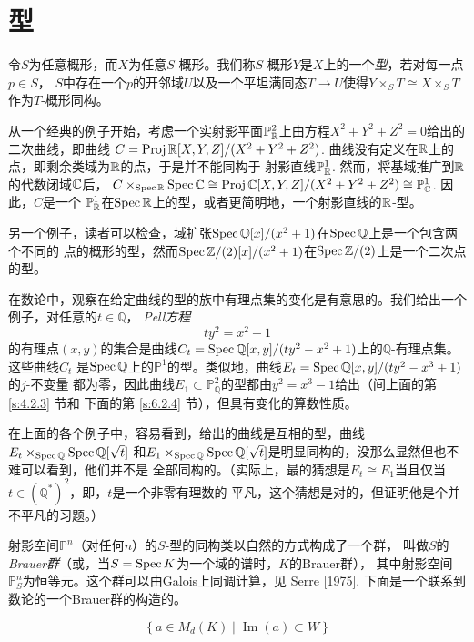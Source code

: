 \section{型}\label{s:4.4}


令$S$为任意概形，而$X$为任意$S$-概形。我们称$S$-概形$Y$是$X$上的一个\textit{型}，若对每一点$p\in S$，
$S$中存在一个$p$的开邻域$U$以及一个平坦满同态$T\to U$使得$Y\times_S T\cong X\times_S T$作为$T$-概形同构。

从一个经典的例子开始，考虑一个实射影平面$\mathbb{P}_{\mathbb{R}}^2$上由方程$X^2+Y^2+Z^2=0$给出的二次曲线，即曲线
$C=\operatorname{Proj} \mathbb{R}[X,Y,Z]/(X^2+Y^2+Z^2)$. 曲线没有定义在$\mathbb{R}$上的点，即剩余类域为$\mathbb{R}$的点，于是并不能同构于
射影直线$\mathbb{P}_{\mathbb{R}}^1$. 然而，将基域推广到$\mathbb{R}$的代数闭域$\mathbb{C}$后，
$C\times_{\operatorname{Spec} \mathbb{R}}\operatorname{Spec} \mathbb{C}\cong \operatorname{Proj} \mathbb{C}[X,Y,Z]/(X^2+Y^2+Z^2)\cong \mathbb{P}_{\mathbb{C}}^1$. 因此，$C$是一个
$\mathbb{P}_{\mathbb{R}}^1$在$\operatorname{Spec} \mathbb{R}$上的型，或者更简明地，一个射影直线的$\mathbb{R}$-型。

另一个例子，读者可以检查，域扩张$\operatorname{Spec} \mathbb Q[x]/(x^2+1)$在$\operatorname{Spec} \mathbb Q$上是一个包含两个不同的
点的概形的型，然而$\operatorname{Spec} \mathbb{Z}/(2)[x]/(x^2+1)$在$\operatorname{Spec} \mathbb{Z}/(2)$上是一个二次点的型。

在数论中，观察在给定曲线的型的族中有理点集的变化是有意思的。我们给出一个例子，对任意的$t\in \mathbb Q$，
\textit{Pell方程}
\[
    ty^2=x^2-1
\]
的有理点$(x,y)$的集合是曲线$C_t=\operatorname{Spec} \mathbb Q[x,y]/(ty^2-x^2+1)$上的$\mathbb Q$-有理点集。这些曲线$C_t$
是$\operatorname{Spec} \mathbb Q$上的$\mathbb P^1$的型。类似地，曲线$E_t=\operatorname{Spec} \mathbb Q[x,y]/(ty^2-x^3+1)$的$j$-不变量
都为零，因此曲线$E_1\subset \mathbb P_{\mathbb Q}^2$的型都由$y^2=x^3-1$给出（间上面的第 \ref{s:4.2.3} 节和
下面的第 \ref{s:6.2.4} 节），但具有变化的算数性质。

在上面的各个例子中，容易看到，给出的曲线是互相的型，曲线$E_t\times_{\operatorname{Spec} \mathbb Q}\operatorname{Spec} \mathbb Q[\sqrt{t}]$
和$E_1\times_{\operatorname{Spec} \mathbb Q}\operatorname{Spec} \mathbb Q[\sqrt{t}]$是明显同构的，没那么显然但也不难可以看到，他们并不是
全部同构的。（实际上，最\naive 的猜想是$E_t\cong E_1$当且仅当$t\in (\mathbb Q^*)^2$，即，$t$是一个非零有理数的
平凡，这个猜想是对的，但证明他是个并不平凡的习题。）


射影空间$\mathbb P^n$（对任何$n$）的$S$-型的同构类以自然的方式构成了一个群，
叫做$S$的\textit{Brauer群}（或，当$S=\operatorname{Spec} K$为一个域的谱时，$K$的Brauer群），
其中射影空间$\mathbb P_S^n$为恒等元。这个群可以由Galois上同调计算，见
Serre [1975]. 下面是一个联系到数论的一个Brauer群的构造的。

\[
    \left\{a \in M_d(K) \mid \operatorname{Im}(a) \subset W\right\}
\]

